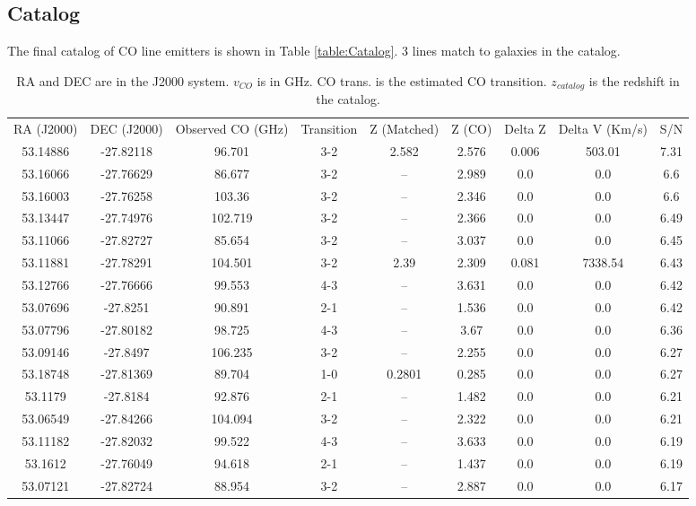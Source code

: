 \subsection{Catalog}

The final catalog of CO line emitters is shown in Table \ref{table:Catalog}. 3 lines match to galaxies in the catalog. 

\begin{table}
\centering
\caption{RA and DEC are in the J2000 system. $v_{CO}$ is in GHz. CO trans. is the estimated CO transition. $z_{catalog}$ is the redshift in the catalog. }
\begin{tabular}{ccccccccc}
RA (J2000) & DEC (J2000) & Observed CO (GHz) & Transition & Z (Matched) & Z (CO) & Delta Z & Delta V (Km/s) & S/N \\
53.14886 & -27.82118 & 96.701 & 3-2 & 2.582 & 2.576 & 0.006 & 503.01 & 7.31 \\
53.16066 & -27.76629 & 86.677 & 3-2 & -- & 2.989 & 0.0 & 0.0 & 6.6 \\
53.16003 & -27.76258 & 103.36 & 3-2 & -- & 2.346 & 0.0 & 0.0 & 6.6 \\
53.13447 & -27.74976 & 102.719 & 3-2 & -- & 2.366 & 0.0 & 0.0 & 6.49 \\
53.11066 & -27.82727 & 85.654 & 3-2 & -- & 3.037 & 0.0 & 0.0 & 6.45 \\
53.11881 & -27.78291 & 104.501 & 3-2 & 2.39 & 2.309 & 0.081 & 7338.54 & 6.43 \\
53.12766 & -27.76666 & 99.553 & 4-3 & -- & 3.631 & 0.0 & 0.0 & 6.42 \\
53.07696 & -27.8251 & 90.891 & 2-1 & -- & 1.536 & 0.0 & 0.0 & 6.42 \\
53.07796 & -27.80182 & 98.725 & 4-3 & -- & 3.67 & 0.0 & 0.0 & 6.36 \\
53.09146 & -27.8497 & 106.235 & 3-2 & -- & 2.255 & 0.0 & 0.0 & 6.27 \\
53.18748 & -27.81369 & 89.704 & 1-0 & 0.2801 & 0.285 & 0.0 & 0.0 & 6.27 \\
53.1179 & -27.8184 & 92.876 & 2-1 & -- & 1.482 & 0.0 & 0.0 & 6.21 \\
53.06549 & -27.84266 & 104.094 & 3-2 & -- & 2.322 & 0.0 & 0.0 & 6.21 \\
53.11182 & -27.82032 & 99.522 & 4-3 & -- & 3.633 & 0.0 & 0.0 & 6.19 \\
53.1612 & -27.76049 & 94.618 & 2-1 & -- & 1.437 & 0.0 & 0.0 & 6.19 \\
53.07121 & -27.82724 & 88.954 & 3-2 & -- & 2.887 & 0.0 & 0.0 & 6.17 \\

\end{tabular}
\end{table}
